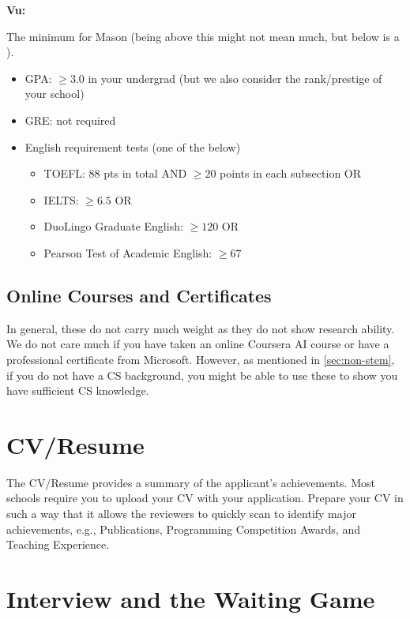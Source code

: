 \documentclass[oneside,11pt,dvipsnames]{book}
\newenvironment{commentbox}[1][]{
  \small
  \begin{mybox}
    {\small \textbf{#1}}
  }{
  \end{mybox}
}
\newcommand{\red}[1]{{\color{red}{#1}}}
\begin{document}
\begin{commentbox}[Vu:]
  The minimum for Mason (being above this might not mean much, but below is a \red{red flag}).
  \begin{itemize}
    \item GPA: $\ge 3.0$ in your undergrad (but we also consider the rank/prestige of your school)
    \item GRE: not required
    \item English requirement tests (one of the below)
          \begin{itemize}
            \item TOEFL: 88 pts in total AND $\ge 20$ points in each subsection OR
            \item IELTS: $\ge 6.5$ OR
            \item DuoLingo Graduate English: $\ge 120$ OR
            \item Pearson Test of Academic English: $\ge 67$
          \end{itemize}
  \end{itemize}
\end{commentbox}


\subsection{Online Courses and Certificates}
In general, these do not carry much weight as they do not show research ability. We do not care much if you have taken an online Coursera AI course or have a professional certificate from Microsoft.
However, as mentioned in \autoref{sec:non-stem}, if you do not have a CS background, you might be able to use these to show you have sufficient CS knowledge.

\section{CV/Resume}
The CV/Resume provides a summary of the applicant's achievements. Most schools require you to upload your CV with your application.
Prepare your CV in such a way that it allows the reviewers to quickly scan to identify major achievements, e.g., Publications, Programming Competition Awards, and Teaching Experience.

\section{Interview and the Waiting Game}\label{sec:interview}
\end{document}
